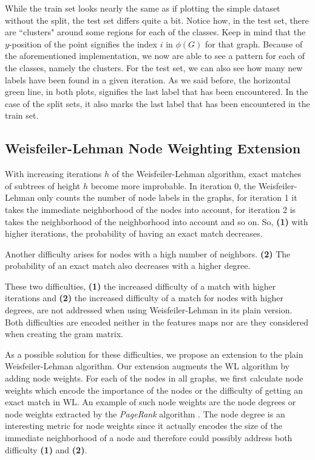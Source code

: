 While the train set looks nearly the same as if plotting the simple dataset without the split, the test set differs quite a bit.
Notice how, in the test set, there are ``clusters" around some regions for each of the classes. 
Keep in mind that the $y$-position of the point signifies the index $i$ in $\phi(G)$ for that graph.
Because of the aforementioned implementation, we now are able to see a pattern for each of the classes, namely the clusters.
For the test set, we can also see how many new labels have been found in a given iteration.
As we said before, the horizontal green line, in both plots, signifies the last label that has been encountered.
In the case of the split sets, it also marks the last label that has been encountered in the train set.


\subsection{Weisfeiler-Lehman Node Weighting Extension}
With increasing iterations $h$ of the Weisfeiler-Lehman algorithm, exact matches of subtrees of height $h$ become more improbable.
In iteration 0, the Weisfeiler-Lehman only counts the number of node labels in the graphs, for iteration 1 it takes the immediate neighborhood of the nodes into account, for iteration 2 is takes the neighborhood of the neighborhood into account and so on.
So, \textbf{(1)} with higher iterations, the probability of having an exact match decreases.

Another difficulty arises for nodes with a high number of neighbors. \textbf{(2)} The probability of an exact match also decreases with a higher degree.

These two difficulties, \textbf{(1)} the increased difficulty of a match with higher iterations and \textbf{(2)} the increased difficulty of a match for nodes with higher degrees, are not addressed when using Weisfeiler-Lehman in its plain version. Both difficulties are encoded neither in the features maps nor are they considered when creating the gram matrix.

As a possible solution for these difficulties, we propose an extension to the plain Weisfeiler-Lehman algorithm.
Our extension augments the WL algorithm by adding node weights.
For each of the nodes in all graphs, we first calculate node weights which encode the importance of the nodes or the difficulty of getting an exact match in WL.
An example of such node weights are the node degrees or node weights extracted by the \textit{PageRank} algorithm \cite{Page1998}.
The node degree is an interesting metric for node weights since it actually encodes the size of the immediate neighborhood of a node and therefore could possibly address both difficulty \textbf{(1)} and \textbf{(2)}.

